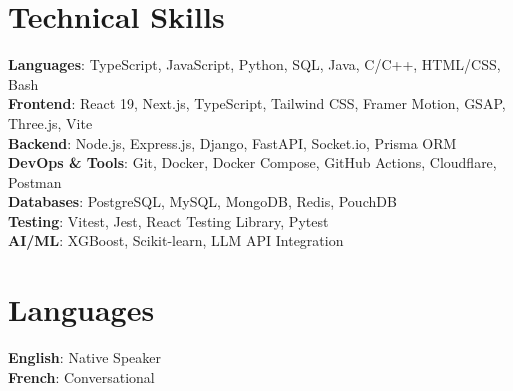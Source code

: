 \documentclass[letterpaper,11pt]{article}
\begin{document}
\section{Technical Skills}
 \begin{itemize}[leftmargin=0.15in, label={}, itemsep=2pt, parsep=0pt]
    \small{\item{
     \textbf{Languages}{: TypeScript, JavaScript, Python, SQL, Java, C/C++, HTML/CSS, Bash} \\
     \textbf{Frontend}{: React 19, Next.js, TypeScript, Tailwind CSS, Framer Motion, GSAP, Three.js, Vite} \\
     \textbf{Backend}{: Node.js, Express.js, Django, FastAPI, Socket.io, Prisma ORM} \\
     \textbf{DevOps \& Tools}{: Git, Docker, Docker Compose, GitHub Actions, Cloudflare, Postman} \\
     \textbf{Databases}{: PostgreSQL, MySQL, MongoDB, Redis, PouchDB} \\
     \textbf{Testing}{: Vitest, Jest, React Testing Library, Pytest} \\
     \textbf{AI/ML}{: XGBoost, Scikit-learn, LLM API Integration}
    }}
 \end{itemize}

\section{Languages}
 \begin{itemize}[leftmargin=0.15in, label={}, itemsep=2pt, parsep=0pt]
    \small{\item{
     \textbf{English}{: Native Speaker} \\
     \textbf{French}{: Conversational}
    }}
 \end{itemize}

\end{document}
